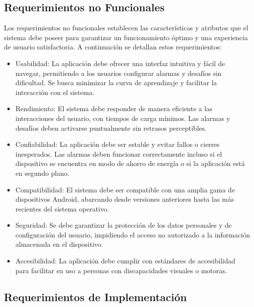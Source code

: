 \subsection{Requerimientos no Funcionales}
Los requerimientos no funcionales establecen las características y atributos que el sistema debe poseer para garantizar un funcionamiento óptimo y una experiencia de usuario satisfactoria. A continuación se detallan estos requerimientos:

\begin{itemize}
    \item Usabilidad: La aplicación debe ofrecer una interfaz intuitiva y fácil de navegar, permitiendo a los usuarios configurar alarmas y desafíos sin dificultad. Se busca minimizar la curva de aprendizaje y facilitar la interacción con el sistema.
    \item Rendimiento: El sistema debe responder de manera eficiente a las interacciones del usuario, con tiempos de carga mínimos. Las alarmas y desafíos deben activarse puntualmente sin retrasos perceptibles.
    \item Confiabilidad: La aplicación debe ser estable y evitar fallos o cierres inesperados. Las alarmas deben funcionar correctamente incluso si el dispositivo se encuentra en modo de ahorro de energía o si la aplicación está en segundo plano.
    \item Compatibilidad: El sistema debe ser compatible con una amplia gama de dispositivos Android, abarcando desde versiones anteriores hasta las más recientes del sistema operativo.
    \item Seguridad: Se debe garantizar la protección de los datos personales y de configuración del usuario, impidiendo el acceso no autorizado a la información almacenada en el dispositivo. 
    \item Accesibilidad: La aplicación debe cumplir con estándares de accesibilidad para facilitar su uso a personas con discapacidades visuales o motoras.
\end{itemize}

\subsection{Requerimientos de Implementación}

